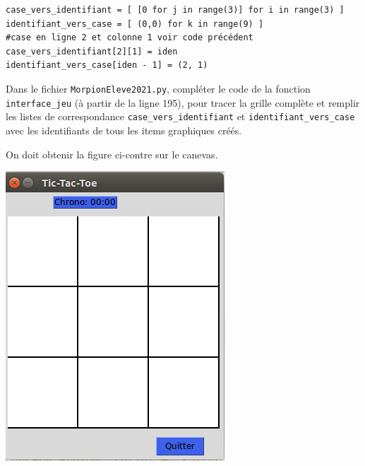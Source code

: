 \documentclass[a4paper, french, 12pt]{article}  %
\newcounter{exo}
\newcounter{exoB}
\newenvironment{exerciceB2}
{\par \bigskip  \noindent \addtocounter{exoB}{1} \hrulefill \quad { \large \textbf{Exercice \theexoB}} \quad \hrulefill \par \medskip }
{\par \bigskip }
\begin{document}
\begin{lstlisting}
case_vers_identifiant = [ [0 for j in range(3)] for i in range(3) ]
identifiant_vers_case = [ (0,0) for k in range(9) ]
#case en ligne 2 et colonne 1 voir code précédent
case_vers_identifiant[2][1] = iden
identifiant_vers_case[iden - 1] = (2, 1)
\end{lstlisting}

	 

\begin{exerciceB2}{}

Dans le fichier \texttt{MorpionEleve2021.py}, compléter   le code de la fonction \verb+interface_jeu+ (à partir de la ligne  195),  pour tracer la grille complète et remplir les listes de correspondance
\lstinline+case_vers_identifiant+ et \lstinline+identifiant_vers_case+ avec les identifiants de tous les items graphiques créés.

\begin{minipage}{0.6\linewidth}


On doit obtenir la figure ci-contre sur le canevas.
\end{minipage}\hfill
\begin{minipage}{0.35\linewidth}
\begin{center}
	\includegraphics[scale=0.5]{graphiques/morpion-blanc.png}
\end{center}
\end{minipage}
\end{exerciceB2}
\end{document}
